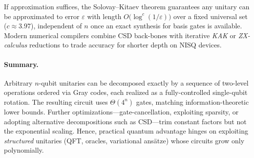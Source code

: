 If approximation suffices, the Solovay–Kitaev theorem guarantees any unitary can be approximated to error $\varepsilon$ with length $O\!\bigl(\log^{c}(1/\varepsilon)\bigr)$ over a fixed universal set ($c\!\approx\!3.97$), independent of $n$ once an exact synthesis for basis gates is available.\cite{Dawson2005solovay} Modern numerical compilers combine CSD back-bones with iterative \emph{KAK} or \emph{ZX-calculus} reductions to trade accuracy for shorter depth on NISQ devices.\cite{Heyfron2018zx}

\paragraph{Summary.}  
Arbitrary $n$-qubit unitaries can be decomposed exactly by a sequence of two-level operations ordered via Gray codes, each realized as a fully-controlled single-qubit rotation.\cite{fedoriaka2025decomposition} The resulting circuit uses $\Theta(4^{n})$ gates, matching information-theoretic lower bounds.\cite{Shende2006synthesis} Further optimizations—gate-cancellation, exploiting sparsity, or adopting alternative decompositions such as CSD—trim constant factors but not the exponential scaling. Hence, practical quantum advantage hinges on exploiting \emph{structured} unitaries (QFT, oracles, variational ansätze) whose circuits grow only polynomially.\cite{Preskill2018nisq}
